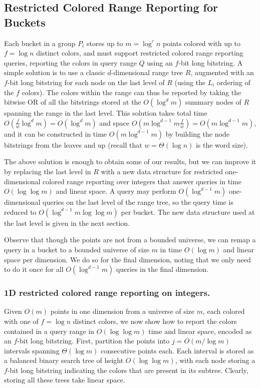 \subsection{Restricted Colored Range Reporting for Buckets}
\label{sec:RCRR}
%
Each bucket in a group $P_i$ stores up to $m = \log^c n$ points colored with up to $f = \log n$ distinct colors, and must support restricted colored range reporting queries, reporting the colors in  query range $Q$ using an $f$-bit long bitstring. A simple solution is to use a classic $d$-dimensional range tree $R$, augmented with an $f$-bit long bitstring for each node on the last level of $R$ (using the $L_i$ ordering of the $f$ colors). The colors within the range can thus be reported by taking the bitwise OR of all the bitstrings stored at the $O(\log^d m)$ summary nodes of $R$ spanning the range in the last level. This solution takes total time $O(\frac{f}{w} \log ^d m) = O(\log ^d m)$ and space $O(m \log ^{d-1} m \frac{f}{w}) = O(m \log ^{d-1} m)$, and it can be constructed in time $O(m \log ^{d-1} m)$ by building the node bitstrings from the leaves and up (recall that $w = \Theta(\log n)$ is the word size). 

The above solution is enough to obtain some of our results, but we can improve it by replacing the last level in $R$ with a new data structure for restricted one-dimensional colored range reporting over integers that answer queries in time $O(\log \log m)$ and linear space. A query may perform $O(\log ^{d-1} m)$ one-dimensional queries on the last level of the range tree, so the query time is reduced to $O(\log ^{d-1} m \log \log m)$ per bucket. The new data structure used at the last level is given in the next section.

Observe that though the points are not from a bounded universe, we can remap a query in a bucket to a bounded universe of size $m$ in time $O(\log m)$ and linear space per dimension. We do so for the final dimension, noting that we only need to do it once for all $O(\log ^{d-1} m)$ queries in the final dimension. 

\subsubsection*{1D restricted colored range reporting on integers.}
%
Given $O(m)$ points in one dimension from a universe of size $m$, each colored with one of $f = \log n$ distinct colors, we now show how to report the colors contained in a query range in $O(\log \log m)$ time and linear space, encoded as an $f$-bit long bitstring. First, partition the points into $j = O(m / \log m)$ intervals spanning $\Theta(\log m)$ consecutive points each. Each interval is stored as a balanced binary search tree of height $O(\log \log m)$, with each node storing a $f$-bit long bitstring indicating the colors that are present in its subtree. Clearly, storing all these trees take linear space.

